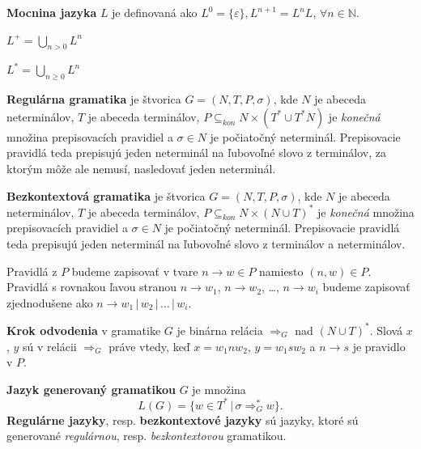 \begin{definition}
    \textbf{Mocnina jazyka} $L$ je definovaná ako $L^0 = \{\varepsilon\}, L^{n+1} = L^nL$, $\forall
    n \in \mathbb{N}$.
    
    $L^+ = \bigcup\limits_{n > 0} L^n$
    
    $L^* = \bigcup\limits_{n \geq 0} L^n$
\end{definition}

\begin{definition}
    \textbf{Regulárna gramatika} je štvorica $G = (N, T, P, \sigma)$, kde $N$ je abeceda
    neterminálov, $T$ je abeceda terminálov, $P \subseteq_{kon} N \times (T^* \cup T^*N)$ je
    \textit{konečná} množina prepisovacích pravidiel a $\sigma \in N$ je počiatočný neterminál.
    Prepisovacie pravidlá teda prepisujú jeden neterminál na ľubovoľné slovo z terminálov, za ktorým
    môže ale nemusí, nasledovať jeden neterminál.
\end{definition}

\begin{definition}
    \textbf{Bezkontextová gramatika} je štvorica $G = (N, T, P, \sigma)$, kde $N$ je abeceda
    neterminálov, $T$ je abeceda terminálov, $P \subseteq_{kon} N \times (N \cup T)^*$ je
    \textit{konečná} množina prepisovacích pravidiel a $\sigma \in N$ je počiatočný neterminál.
    Prepisovacie pravidlá teda prepisujú jeden neterminál na ľubovoľné slovo z terminálov a
    neterminálov.
\end{definition}

\begin{note}
    Pravidlá z $P$ budeme zapisovať v tvare $n \rightarrow w \in P$ namiesto $(n, w) \in P$.
    Pravidlá s rovnakou ľavou stranou $n \rightarrow w_1$, $n \rightarrow w_2$, \dots, $n\rightarrow
    w_i$ budeme zapisovať zjednodušene ako $n \rightarrow w_1 \, | \, w_2 \, | \, \dots \, | \,
    w_i$.
\end{note}

\begin{definition}
    \textbf{Krok odvodenia} v gramatike $G$ je binárna relácia $\Rightarrow_G$ nad $(N \cup T)^*$.
    Slová $x$, $y$ sú v relácii $\Rightarrow_G$ práve vtedy, keď $x = w_1 n w_2$, $y = w_1 s w_2$ a
    $n \rightarrow s$ je pravidlo v $P$.
\end{definition}

\begin{definition}
    \textbf{Jazyk generovaný gramatikou} $G$ je množina 
    $$L(G) = \{w \in T^* \, | \, \sigma \Rightarrow_G^*w\}\text{.}$$ \textbf{Regulárne jazyky},
    resp. \textbf{bezkontextové jazyky} sú jazyky, ktoré sú generované \textit{regulárnou}, resp.
    \textit{bezkontextovou} gramatikou.
\end{definition}

